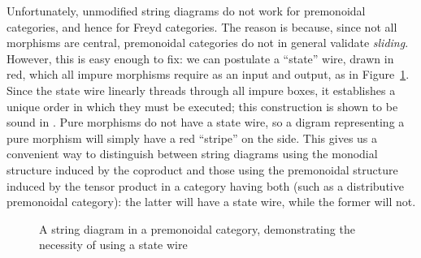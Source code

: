 \documentclass[acmsmall,screen,review]{acmart}
\newcommand{\nats}{\mathbb{N}}
\begin{document}
Unfortunately, unmodified string diagrams do not work for premonoidal categories, and hence for
Freyd categories. The reason is because, since not all morphisms are central, premonoidal categories
do not in general validate \emph{sliding}. However, this is easy enough to fix: we can postulate a
``state'' wire, drawn in red, which all impure morphisms require as an input and output, as in
Figure~\ref{fig:premonoidal-string-diagram}. Since the state wire linearly threads through all
impure boxes, it establishes a unique order in which they must be executed; this construction is
shown to be sound in \citet{promonad}. Pure morphisms do not have a state wire, so a digram
representing a pure morphism will simply have a red ``stripe'' on the side. This gives us a
convenient way to distinguish between string diagrams using the monodial structure induced by the
coproduct and those using the premonoidal structure induced by the tensor product in a category
having both (such as a distributive premonoidal category): the latter will have a state wire, while
the former will not.

\begin{figure}
  \caption{
    A string diagram in a premonoidal category, demonstrating the necessity of using a state wire
  }
  \label{fig:premonoidal-string-diagram}
\end{figure}
\end{document}
